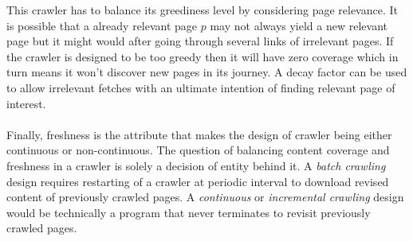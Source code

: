 \noindent
This crawler has to balance its greediness level by considering page relevance. It is possible that a
already relevant page $p$ may not always yield a new relevant page but it might would after going through
several links of irrelevant pages. If the crawler is designed to be too greedy then it will have zero
coverage which in turn means it won't discover new pages in its journey. A decay factor can be used to
allow irrelevant fetches with an ultimate intention of finding relevant page of interest.
\\
\\
Finally, freshness is the attribute that makes the design of crawler being either continuous or non-continuous. The question of balancing content coverage and freshness in a crawler is solely a decision of entity behind it. A \textit{batch crawling} design requires restarting of a crawler at periodic interval to download revised content of previously crawled pages. A \textit{continuous} or \textit{incremental crawling} design
would be technically a program that never terminates to revisit previously crawled pages.


